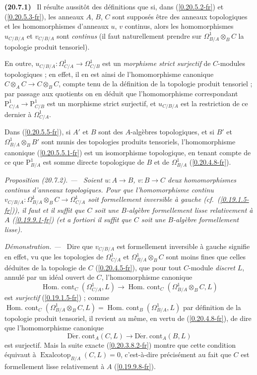 \documentclass[10pt,oneside]{book}
\makeatletter
\newcommand{\sref}[1]{(\ref{#1})}
\newcommand{\setmanualcurrentlabel}[1]{\def\@currentlabel{#1}}
\newcommand{\oldpage}[2][]{%
  \setcounter{footnote}{0}%
  \marginpar{\scriptsize\textbf{#1}~|~#2}\ignorespaces}
\newenvironment{env}[1][]{\setmanualcurrentlabel{#1}\par\medskip\noindent\textbf{(#1)}\ }{\par}
\newenvironment{proposition}[1][]{%
  \setmanualcurrentlabel{#1}\par\medskip\noindent\itshape Proposition (#1). ---\ }{\par}
\newenvironment{proof}{%
  \par\medskip\noindent\textit{Démonstration. ---\ }}{\par}
\makeatother
\begin{document}
\begin{env}[20.7.1]
\label{0.20.7.1-fr}
Il résulte aussitôt des définitions que si, dans \sref{0.20.5.2-fr} et
\sref{0.20.5.3-fr}, les anneaux $A$, $B$, $C$ sont supposés être des anneaux
topologiques et les homomorphismes d'anneaux $u$, $v$ continus, alors les
homomorphismes $u_{C/B/A}$ et $v_{C/B/A}$ sont \emph{continus} (il faut
naturellement prendre sur $\Omega^1_{B/A}\otimes_B C$ la topologie produit
tensoriel).

En outre, $u_{C/B/A}:\Omega^1_{C/A}\to\Omega^1_{C/B}$ est un
\emph{morphisme strict surjectif} de $C$-modules topologiques ; en effet, il en
est ainsi de l'homomorphisme canonique $C\otimes_A C\to C\otimes_B C$, compte
tenu de la définition de la topologie produit tensoriel ; par passage aux
quotients on en déduit que l'homomorphisme correspondant
$\mathrm{P}^1_{C/A}\to\mathrm{P}^1_{C/B}$ est un morphisme strict surjectif,
et $u_{C/B/A}$ est la restriction de ce dernier à $\Omega^1_{C/A}$.

Dans \sref{0.20.5.5-fr}, si $A'$ et $B$ sont des $A$-algèbres topologiques,
et si $B'$ et $\Omega^1_{B/A}\otimes_B B'$ sont munis des topologies produits
tensoriels, l'homomorphisme canonique \sref{0.20.5.5.1-fr} est un isomorphisme
topologique, en tenant compte de ce que $\mathrm{P}^1_{B/A}$ est somme directe
topologique de $B$ et de $\Omega^1_{B/A}$ \sref{0.20.4.8-fr}.
\end{env}

\begin{proposition}[20.7.2]
\label{0.20.7.2-fr}
Soient $u:A\to B$, $v:B\to C$ deux homomorphismes continus d'anneaux
topologiques. Pour que l'homomorphisme continu
$v_{C/B/A}:\Omega^1_{B/A}\otimes_B C\to\Omega^1_{C/A}$ soit formellement
inversible à gauche (cf.\ \sref{0.19.1.5-fr}), il faut et il suffit que $C$
soit une $B$-algèbre formellement lisse relativement à $A$
\sref{0.19.9.1-fr} (et \emph{a fortiori} il suffit que $C$ soit une
$B$-algèbre formellement lisse).
\end{proposition}

\begin{proof}
Dire que $v_{C/B/A}$ est formellement inversible à gauche signifie en effet,
vu que les topologies de $\Omega^1_{C/A}$ et $\Omega^1_{B/A}\otimes_B C$
sont moins fines que celles déduites de la topologie de $C$
\sref{0.20.4.5-fr}, que pour tout $C$-module \emph{discret} $L$, annulé par un
idéal ouvert de $C$, l'homomorphisme canonique
\[
  \operatorname{Hom.\ cont}_C(\Omega^1_{C/A},L)\to
  \operatorname{Hom.\ cont}_C(\Omega^1_{B/A}\otimes_B C,L)
\]
\oldpage[0\textsubscript{IV-1}]{148}
est \emph{surjectif} \sref{0.19.1.5-fr} ; comme
$\operatorname{Hom.\ cont}_C(\Omega^1_{B/A}\otimes_B C,L)=
\operatorname{Hom.\ cont}_B(\Omega^1_{B/A},L)$ par définition de la topologie
produit tensoriel, il revient au même, en vertu de \sref{0.20.4.8-fr}, de dire
que l'homomorphisme canonique
\[
  \operatorname{D\acute{e}r.\ cont}_A(C,L)\to
  \operatorname{D\acute{e}r.\ cont}_A(B,L)
\]
est surjectif. Mais la suite exacte \sref{0.20.3.8.2-fr} montre que cette
condition équivaut à $\operatorname{Exalcotop}_{B/A}(C,L)=0$, c'est-à-dire
précisément au fait que $C$ est formellement lisse relativement à $A$
\sref{0.19.9.8-fr}.
\end{proof}
\end{document}
